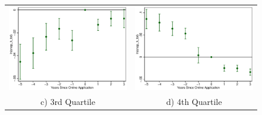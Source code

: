 \documentclass[11pt,letterpaper]{article}
\begin{document}
\begin{figure}
\begin{tabular}{cc}
\includegraphics[scale=0.57]{tabfig/evstu_size3_snap_h_tot_one_yrcfcttr_5_3}&\includegraphics[scale=0.57]{tabfig/evstu_size4_snap_h_tot_one_yrcfcttr_5_3}\\
c) 3rd Quartile & d) 4th Quartile\\
\end{tabular}
\end{figure}
\end{document}
